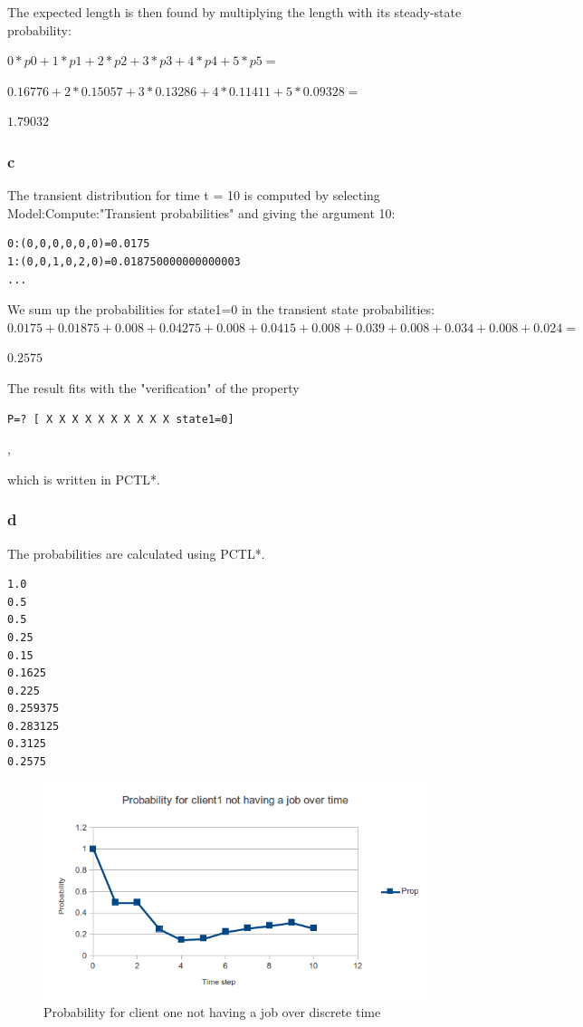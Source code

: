 The expected length is then found by
multiplying the length with its steady-state probability:

$0*p0 + 1*p1 + 2*p2 + 3*p3 + 4*p4 + 5*p5 =$

$0.16776 + 2*0.15057 + 3*0.13286 + 4*0.11411 + 5*0.09328 =$

$1.79032$

\subsubsection{c}

The transient distribution for time t = 10 is computed by
selecting Model:Compute:"Transient probabilities"
and giving the argument 10:

\begin{verbatim}
0:(0,0,0,0,0,0)=0.0175
1:(0,0,1,0,2,0)=0.018750000000000003
...
\end{verbatim}

We sum up the probabilities for state1=0 in the transient state probabilities:
$0.0175 + 0.01875 + 0.008 + 0.04275 + 0.008 + 0.0415 + 0.008 + 0.039 + 0.008 + 0.034 + 0.008 + 0.024 =$

$0.2575$

The result fits with the "verification" of the property

\begin{verbatim}P=? [ X X X X X X X X X X state1=0]\end{verbatim},

which is written in PCTL*.

\subsubsection{d}

The probabilities are calculated using PCTL*.

\begin{verbatim}
1.0
0.5
0.5
0.25
0.15
0.1625
0.225
0.259375
0.283125
0.3125
0.2575
\end{verbatim}

\begin{figure}[!htb]
\centering
\includegraphics[scale=.75]{images/chart_client1_nojob_time_prop.png}
\caption{Probability for client one not having a job over discrete time}
\label{fig:nojobprop}
\end{figure}

